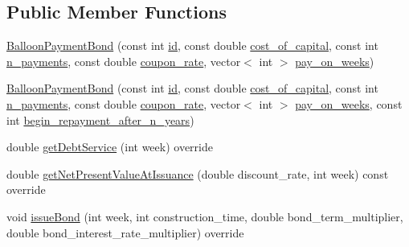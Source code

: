 \subsection*{Public Member Functions}
\begin{DoxyCompactItemize}
\item 
\mbox{\hyperlink{classBalloonPaymentBond_a03b25124896e67f851a35721c37705fe_a03b25124896e67f851a35721c37705fe}{Balloon\+Payment\+Bond}} (const int \mbox{\hyperlink{classBond_a7f75bcafbc16676ad6dbafbf40afae4a_a7f75bcafbc16676ad6dbafbf40afae4a}{id}}, const double \mbox{\hyperlink{classBond_ad98df7d28b398e620286f95ee085439b_ad98df7d28b398e620286f95ee085439b}{cost\+\_\+of\+\_\+capital}}, const int \mbox{\hyperlink{classBond_a4a227b6de2eeada118d82ab1633b1db8_a4a227b6de2eeada118d82ab1633b1db8}{n\+\_\+payments}}, const double \mbox{\hyperlink{classBond_a5f66785534e24caa43d9f730130a6463_a5f66785534e24caa43d9f730130a6463}{coupon\+\_\+rate}}, vector$<$ int $>$ \mbox{\hyperlink{classBond_ae8dd46fcbf95c993460ffe4ea1f52739_ae8dd46fcbf95c993460ffe4ea1f52739}{pay\+\_\+on\+\_\+weeks}})
\item 
\mbox{\hyperlink{classBalloonPaymentBond_afc8bb53b6642dac9811414b447279e5b_afc8bb53b6642dac9811414b447279e5b}{Balloon\+Payment\+Bond}} (const int \mbox{\hyperlink{classBond_a7f75bcafbc16676ad6dbafbf40afae4a_a7f75bcafbc16676ad6dbafbf40afae4a}{id}}, const double \mbox{\hyperlink{classBond_ad98df7d28b398e620286f95ee085439b_ad98df7d28b398e620286f95ee085439b}{cost\+\_\+of\+\_\+capital}}, const int \mbox{\hyperlink{classBond_a4a227b6de2eeada118d82ab1633b1db8_a4a227b6de2eeada118d82ab1633b1db8}{n\+\_\+payments}}, const double \mbox{\hyperlink{classBond_a5f66785534e24caa43d9f730130a6463_a5f66785534e24caa43d9f730130a6463}{coupon\+\_\+rate}}, vector$<$ int $>$ \mbox{\hyperlink{classBond_ae8dd46fcbf95c993460ffe4ea1f52739_ae8dd46fcbf95c993460ffe4ea1f52739}{pay\+\_\+on\+\_\+weeks}}, const int \mbox{\hyperlink{classBalloonPaymentBond_a7e1e064643021755eda4873b0c98e434_a7e1e064643021755eda4873b0c98e434}{begin\+\_\+repayment\+\_\+after\+\_\+n\+\_\+years}})
\item 
double \mbox{\hyperlink{classBalloonPaymentBond_a8648a2ae688f90a3b2e6689711c22b9d_a8648a2ae688f90a3b2e6689711c22b9d}{get\+Debt\+Service}} (int week) override
\item 
double \mbox{\hyperlink{classBalloonPaymentBond_a11e5aecaf542cfbbb2303e98fb0b93bf_a11e5aecaf542cfbbb2303e98fb0b93bf}{get\+Net\+Present\+Value\+At\+Issuance}} (double discount\+\_\+rate, int week) const override
\item 
void \mbox{\hyperlink{classBalloonPaymentBond_af22552acd74b08dbb1d308cc5e45344c_af22552acd74b08dbb1d308cc5e45344c}{issue\+Bond}} (int week, int construction\+\_\+time, double bond\+\_\+term\+\_\+multiplier, double bond\+\_\+interest\+\_\+rate\+\_\+multiplier) override
\end{DoxyCompactItemize}
